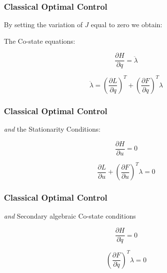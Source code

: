 \documentclass{beamer}
\begin{document}

\begin{frame}
\frametitle{Classical Optimal Control}

By setting the variation of $J$ equal to zero we obtain:

The Co-state equations:

\begin{equation}
\frac{\partial H}{ \partial q } = \ddot \lambda
\end{equation}

\begin{equation}
\ddot \lambda = ( \frac{\partial L}{\partial q}  )^T + ( \frac{\partial F}{\partial q} )^T \lambda
\end{equation}

\end{frame}




\begin{frame}
\frametitle{Classical Optimal Control}

\textit{and} the Stationarity Conditions:

\begin{equation}
    \frac{\partial H}{\partial u} = 0 
\end{equation}

\begin{equation}
    \frac{\partial L}{\partial u} +( \frac{\partial F}{\partial u} )^T \lambda = 0
\end{equation}

\end{frame}




\begin{frame}
\frametitle{Classical Optimal Control}

\textit{and} Secondary algebraic Co-state conditions

\begin{equation}
    \frac{\partial H}{\partial \dot q} = 0
\end{equation}

\begin{equation}
    (\frac{\partial F}{\partial \dot q})^T \lambda = 0 
\end{equation}


\end{frame}
\end{document}
